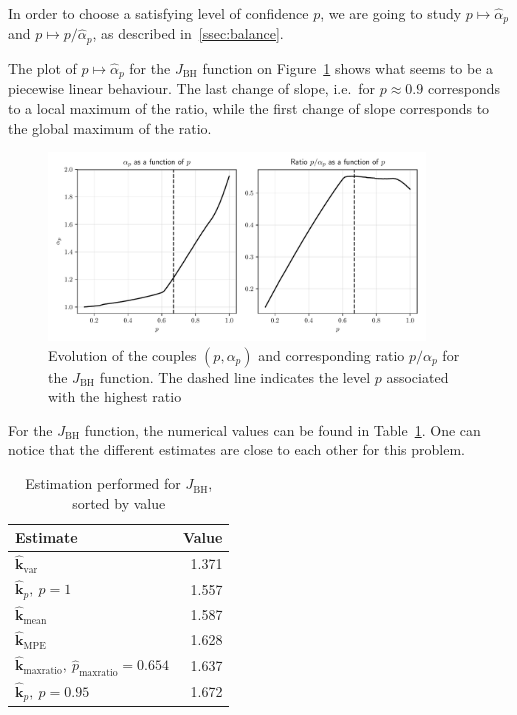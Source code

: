\documentclass[preprint, 1p]{elsarticle}
\newcommand{\hatkmean}{\hat{\mathbf{k}}_{\mathrm{mean}}}
\newcommand{\hatkvar}{\hat{\mathbf{k}}_{\mathrm{var}}}
\newcommand{\hatkmpe}{\hat{\mathbf{k}}_{\mathrm{MPE}}}
\newcommand{\kest}{\hat{\mathbf{k}}}
\newcommand{\checkap}{{\alpha}_p}
\newcommand{\checka}{{\alpha}}
\newcommand{\checkk}{\mathbf{k}}
\begin{document}

In order to choose a satisfying level of confidence $p$, we are going to study $p\mapsto \hat{\checka}_p$ and $p\mapsto p/\hat{\checka}_p$, as described in~\ref{ssec:balance}.

 The plot of $p\mapsto \hat{\checka}_p$ for the $J_{\mathrm{BH}}$ function on Figure~\ref{fig:ratio_BH} shows what seems to be a piecewise linear behaviour. The last change of slope, i.e.\ for $p\approx 0.9$ corresponds to a local maximum of the ratio, while the first change of slope corresponds to the global maximum of the ratio.
 
 \begin{figure}[!ht]
   \centering
\includegraphics[width=10cm]{Figures/alpha_p_BH.pdf}
\caption{Evolution of the couples $(p,\checkap)$ and corresponding ratio $p/\checkap$ for the $J_{\mathrm{BH}}$ function. The dashed line indicates the level $p$ associated with the highest ratio}
\label{fig:ratio_BH}
\end{figure}
 
 For the $J_{\mathrm{BH}}$ function, the numerical values can be found in Table~\ref{tab:recap_estimates_branin}. One can notice that the different estimates are close to each other for this problem.
 
\begin{table}[!ht]
\centering
\caption{Estimation performed for $J_{\mathrm{BH}}$, sorted by value}
\label{tab:recap_estimates_branin}
\begin{tabular}{lr}
\toprule
Estimate & Value \\ \midrule
$\hatkvar$ & 1.371 \\ 
$\kest_p,~p=1$ & 1.557 \\ 
$\hatkmean$ & 1.587 \\ 
  $\hatkmpe$ & 1.628 \\
  $\kest_{\mathrm{maxratio}},~\hat{p}_{\mathrm{maxratio}}=0.654$ & 1.637 \\
$\kest_p,~p=0.95$ & 1.672 \\ \bottomrule
\end{tabular}
\end{table}
\end{document}
